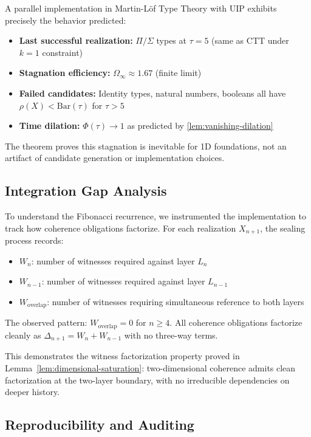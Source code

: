 \documentclass[11pt]{article}
\theoremstyle{definition}
\theoremstyle{remark}
\begin{document}
A parallel implementation in Martin-Löf Type Theory with UIP exhibits precisely the behavior predicted:

\begin{itemize}
\item \textbf{Last successful realization:} $\Pi/\Sigma$ types at $\tau = 5$ (same as CTT under $k=1$ constraint)
\item \textbf{Stagnation efficiency:} $\Omega_{\infty} \approx 1.67$ (finite limit)
\item \textbf{Failed candidates:} Identity types, natural numbers, booleans all have $\rho(X) < \mathrm{Bar}(\tau)$ for $\tau > 5$
\item \textbf{Time dilation:} $\Phi(\tau) \to 1$ as predicted by \cref{lem:vanishing-dilation}
\end{itemize}

The theorem proves this stagnation is inevitable for 1D foundations, not an artifact of candidate generation or implementation choices.

\subsection{Integration Gap Analysis}

To understand the Fibonacci recurrence, we instrumented the implementation to track how coherence obligations factorize. For each realization $X_{n+1}$, the sealing process records:

\begin{itemize}
\item $W_n$: number of witnesses required against layer $L_n$
\item $W_{n-1}$: number of witnesses required against layer $L_{n-1}$
\item $W_{\text{overlap}}$: number of witnesses requiring simultaneous reference to both layers
\end{itemize}

The observed pattern: $W_{\text{overlap}} = 0$ for $n \geq 4$. All coherence obligations factorize cleanly as $\Delta_{n+1} = W_n + W_{n-1}$ with no three-way terms.

This demonstrates the witness factorization property proved in Lemma~\ref{lem:dimensional-saturation}: two-dimensional coherence admits clean factorization at the two-layer boundary, with no irreducible dependencies on deeper history.

\subsection{Reproducibility and Auditing}
\end{document}
